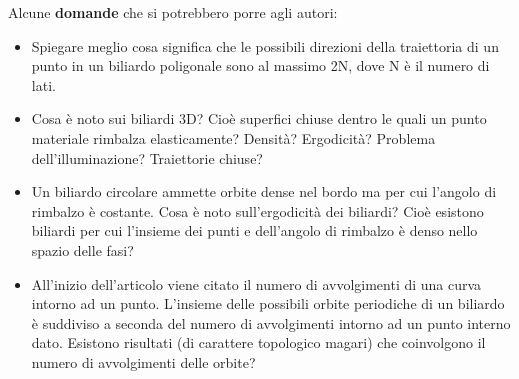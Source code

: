 \documentclass[10pt,a4paper]{article}
\begin{document}
Alcune \textbf{domande} che si potrebbero porre agli autori:

\begin{itemize}
\item Spiegare meglio cosa significa che le possibili direzioni della traiettoria di un punto in un biliardo poligonale sono al massimo 2N, dove N è il numero di lati.

\item Cosa è noto sui biliardi 3D? Cioè superfici chiuse dentro le quali un punto materiale rimbalza elasticamente? Densità? Ergodicità? Problema dell'illuminazione? Traiettorie chiuse?

\item Un biliardo circolare ammette orbite dense nel bordo ma per cui l'angolo di rimbalzo è costante. Cosa è noto sull'ergodicità dei biliardi? Cioè esistono biliardi per cui l’insieme dei punti e dell'angolo di rimbalzo è denso nello spazio delle fasi? 

\item All'inizio dell'articolo viene citato il numero di avvolgimenti di una curva intorno ad un punto. L'insieme delle possibili orbite periodiche di un biliardo è suddiviso a seconda del numero di avvolgimenti intorno ad un punto interno dato. Esistono risultati (di carattere topologico magari) che coinvolgono il numero di avvolgimenti delle orbite?

\end{itemize}
\end{document}

